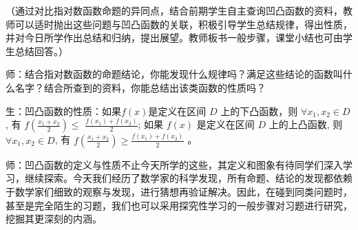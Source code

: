 （通过对比指对数函数命题的异同点，结合前期学生自主查询凹凸函数的资料，教师可以适时抛出这些问题与凹凸函数的关联，积极引导学生总结规律，得出性质，并对今日所学作出总结和归纳，提出展望。教师板书一般步骤，课堂小结也可由学生总结回答。）

师：结合指对数函数的命题结论，你能发现什么规律吗？满足这些结论的函数叫什么名字？结合所查到的资料，你能总结出该类函数的性质吗？

生：凹凸函数的性质：如果$f(x)$是定义在区间 $D$ 上的下凸函数，则 $\forall x_{1}, x_{2} \in D$, 有 $f\left(\frac{x_{1}+x_{2}}{2}\right) \leq$ $\frac{f(x_{1})+f(x_{2})}{2}$; 如果 $f(x)$ 是定义在区间 $D$ 上的上凸函数, 则 $\forall x_{1}, x_{2} \in D$, 有 $f\left(\frac{x_{1}+x_{2}}{2}\right) \geq \frac{f(x_{1})+f(x_{2})}{2}$ 。

师：凹凸函数的定义与性质不止今天所学的这些，其定义和图象有待同学们深入学习，继续探索。今天我们经历了数学家的科学发现，所有命题、结论的发现都依赖于数学家们细致的观察与发现，进行猜想再验证解决。因此，在碰到同类问题时，甚至是完全陌生的习题，我们也可以采用探究性学习的一般步骤对习题进行研究，挖掘其更深刻的内涵。
